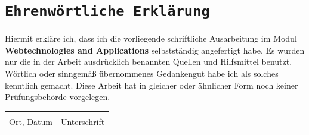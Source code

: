 \documentclass[a4paper,12pt]{article}
\begin{document}
\newpage
{}
\section*{\texttt{Ehrenwörtliche Erklärung}}
Hiermit erkläre ich, dass ich die vorliegende schriftliche Ausarbeitung im Modul \textbf{Webtechnologies and Applications} selbstständig
angefertigt habe. Es wurden nur die in der Arbeit ausdrücklich benannten Quellen und
Hilfsmittel benutzt. Wörtlich oder sinngemäß übernommenes Gedankengut habe ich als
solches kenntlich gemacht. Diese Arbeit hat in gleicher oder ähnlicher Form noch keiner
Prüfungsbehörde vorgelegen.

\vspace{3cm}
\noindent\begin{tabular}{p{}p{}}
    \hrulefill & \hrulefill \\
    Ort, Datum & Unterschrift \\
\end{tabular}
\end{document}
